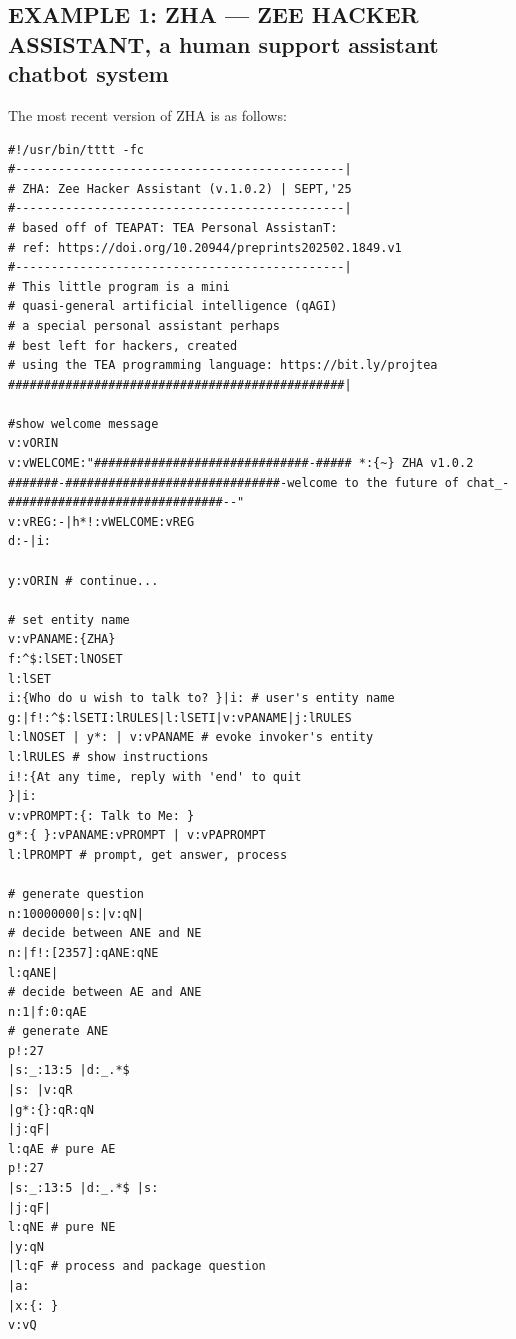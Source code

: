 \documentclass[a4paper, 18pt]{book} %
\begin{document}
\subsection{EXAMPLE 1: ZHA --- ZEE HACKER ASSISTANT, a human support assistant chatbot system}
\label{SECEXAMP1F}  
  
 
 The most recent version of ZHA is as follows:
 

 \small
  \begin{tcolorbox}[teaterminalstyle, title=TEA Program: ZEE HACKER ASSISTANT v1.0.2, breakable]
  \begin{lstlisting}[language=TEA,breaklines=true]
#!/usr/bin/tttt -fc
#----------------------------------------------|
# ZHA: Zee Hacker Assistant (v.1.0.2) | SEPT,'25
#----------------------------------------------|
# based off of TEAPAT: TEA Personal AssistanT:
# ref: https://doi.org/10.20944/preprints202502.1849.v1
#----------------------------------------------|
# This little program is a mini
# quasi-general artificial intelligence (qAGI)
# a special personal assistant perhaps
# best left for hackers, created 
# using the TEA programming language: https://bit.ly/projtea
###############################################|

#show welcome message
v:vORIN
v:vWELCOME:"##############################-##### *:{~} ZHA v1.0.2 #######-##############################-welcome to the future of chat_-##############################--"
v:vREG:-|h*!:vWELCOME:vREG
d:-|i:

y:vORIN # continue...

# set entity name
v:vPANAME:{ZHA}
f:^$:lSET:lNOSET
l:lSET
i:{Who do u wish to talk to? }|i: # user's entity name
g:|f!:^$:lSETI:lRULES|l:lSETI|v:vPANAME|j:lRULES 
l:lNOSET | y*: | v:vPANAME # evoke invoker's entity
l:lRULES # show instructions
i!:{At any time, reply with 'end' to quit
}|i:
v:vPROMPT:{: Talk to Me: }
g*:{ }:vPANAME:vPROMPT | v:vPAPROMPT
l:lPROMPT # prompt, get answer, process

# generate question
n:10000000|s:|v:qN|
# decide between ANE and NE
n:|f!:[2357]:qANE:qNE
l:qANE|
# decide between AE and ANE
n:1|f:0:qAE
# generate ANE
p!:27
|s:_:13:5 |d:_.*$
|s: |v:qR
|g*:{}:qR:qN
|j:qF|
l:qAE # pure AE
p!:27
|s:_:13:5 |d:_.*$ |s:
|j:qF|
l:qNE # pure NE
|y:qN
|l:qF # process and package question 
|a:
|x:{: }
v:vQ


\end{lstlisting}
\end{tcolorbox}
\end{document}
